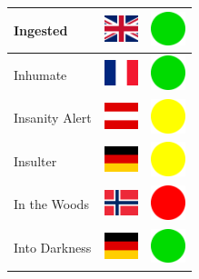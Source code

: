\documentclass[12pt, a4paper, twoside]{report}
\begin{document}
\begin{center}
\begin{longtable}{|p{5cm}|p{2cm}|p{2cm}|}
			Ingested & \includegraphics[width=1cm]{4x3/gb} & \includegraphics[width=1cm]{likes/y} \\ \hline
			Inhumate & \includegraphics[width=1cm]{4x3/fr} & \includegraphics[width=1cm]{likes/y} \\ \hline
			Insanity Alert & \includegraphics[width=1cm]{4x3/at} & \includegraphics[width=1cm]{likes/m} \\ \hline
			Insulter & \includegraphics[width=1cm]{4x3/de} & \includegraphics[width=1cm]{likes/m} \\ \hline
			In the Woods & \includegraphics[width=1cm]{4x3/no} & \includegraphics[width=1cm]{likes/n} \\ \hline
			Into Darkness & \includegraphics[width=1cm]{4x3/de} & \includegraphics[width=1cm]{likes/y} \\ \hline

\end{longtable}
\end{center}
\end{document}
